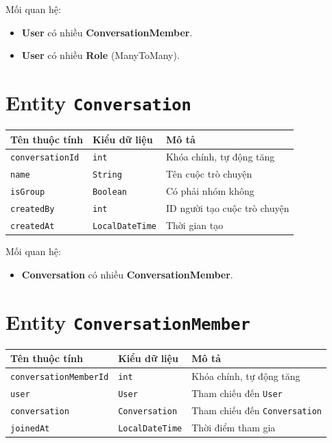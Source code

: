 \vspace{0.5cm}
Mối quan hệ:
\begin{itemize}
    \item \textbf{User} có nhiều \textbf{ConversationMember}.
    \item \textbf{User} có nhiều \textbf{Role} (ManyToMany).
\end{itemize}

\section{Entity \texttt{Conversation}}

\begin{longtable}{|>{\raggedright\arraybackslash}p{4cm}|>{\raggedright\arraybackslash}p{4cm}|>{\raggedright\arraybackslash}p{6cm}|}
\hline
\textbf{Tên thuộc tính} & \textbf{Kiểu dữ liệu} & \textbf{Mô tả} \\
\hline
\texttt{conversationId} & \texttt{int} & Khóa chính, tự động tăng \\
\hline
\texttt{name} & \texttt{String} & Tên cuộc trò chuyện \\
\hline
\texttt{isGroup} & \texttt{Boolean} & Có phải nhóm không \\
\hline
\texttt{createdBy} & \texttt{int} & ID người tạo cuộc trò chuyện \\
\hline
\texttt{createdAt} & \texttt{LocalDateTime} & Thời gian tạo \\
\hline
\end{longtable}

\vspace{0.5cm}
Mối quan hệ:
\begin{itemize}
    \item \textbf{Conversation} có nhiều \textbf{ConversationMember}.
\end{itemize}

\section{Entity \texttt{ConversationMember}}

\begin{longtable}{|>{\raggedright\arraybackslash}p{4cm}|>{\raggedright\arraybackslash}p{4cm}|>{\raggedright\arraybackslash}p{6cm}|}
\hline
\textbf{Tên thuộc tính} & \textbf{Kiểu dữ liệu} & \textbf{Mô tả} \\
\hline
\texttt{conversationMemberId} & \texttt{int} & Khóa chính, tự động tăng \\
\hline
\texttt{user} & \texttt{User} & Tham chiếu đến \texttt{User} \\
\hline
\texttt{conversation} & \texttt{Conversation} & Tham chiếu đến \texttt{Conversation} \\
\hline
\texttt{joinedAt} & \texttt{LocalDateTime} & Thời điểm tham gia \\
\hline
\end{longtable}

